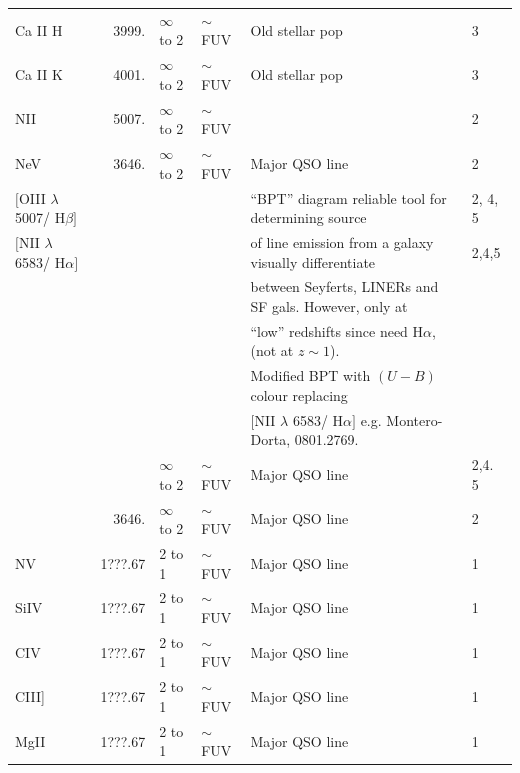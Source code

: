 \documentclass[11pt]{article}
\begin{document}
\begin{landscape}
\begin{table}
\begin{center}
\begin{tabular}{lrllll}
      \hline
      Ca II H          & 3999.   & $\infty$ to 2 & $\sim$FUV & Old stellar pop & 3 \\
      Ca II K          & 4001.   & $\infty$ to 2 & $\sim$FUV & Old stellar pop & 3 \\
      \hline
      NII              & 5007.   & $\infty$ to 2 & $\sim$FUV &  & 2 \\
      \hline
      NeV              & 3646.   & $\infty$ to 2 & $\sim$FUV & Major QSO line & 2 \\
      \hline
      $[$OIII $\lambda$ 5007/ H$\beta]$ &   &  &   & ``BPT'' diagram reliable tool for determining source & 2, 4, 5 \\
      $[$NII $\lambda$ 6583/ H$\alpha]$ & & & & of line emission from a galaxy visually differentiate & 2,4,5 \\
                                      & & & & between Seyferts, LINERs and SF gals. However, only at & \\
                                      & & & & ``low'' redshifts since need H$\alpha$, (not at $z\sim1$). & \\
                                      & & & &  Modified BPT with $(U-B)$ colour replacing & \\
                                      & & & & $[$NII $\lambda$ 6583/ H$\alpha]$ e.g. Montero-Dorta, 0801.2769. & \\
      \hline
      [SII $\lambda$ 6583/ H$\alpha$]   &    & $\infty$ to 2 & $\sim$FUV & Major QSO line & 2,4. 5  \\
      \hline
      [$\alpha$/Fe]             & 3646.   & $\infty$ to 2 & $\sim$FUV & Major QSO line & 2 \\
      \hline
      NV               & 1???.67 & 2 to 1        & $\sim$FUV & Major QSO line       & 1 \\
      SiIV             & 1???.67 & 2 to 1        & $\sim$FUV & Major QSO line       & 1 \\
      CIV              & 1???.67 & 2 to 1        & $\sim$FUV & Major QSO line       & 1 \\
      CIII]            & 1???.67 & 2 to 1        & $\sim$FUV & Major QSO line       & 1 \\
      MgII             & 1???.67 & 2 to 1        & $\sim$FUV & Major QSO line       & 1 \\
      \hline
      \hline
    \end{tabular}
  \end{center}
\end{table}
\end{landscape}
\end{document}
